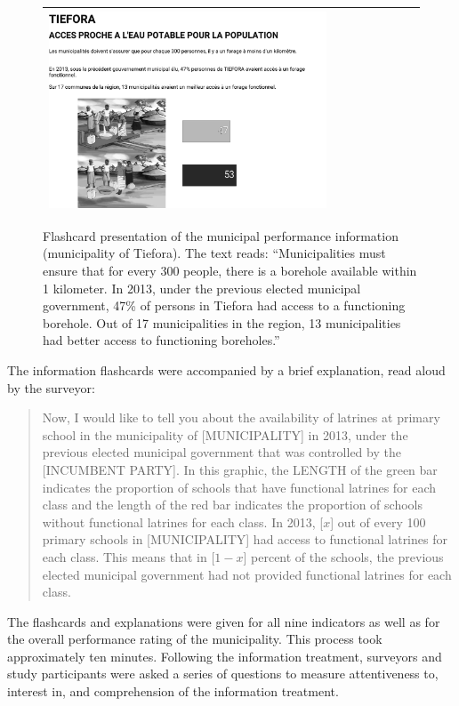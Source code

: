 \documentclass[11pt]{article}
\begin{document}
\begin{figure}
\begin{center}
\begin{tabularx}{0.8\textwidth}{|X|}
\hline
\vspace{0.1em}
\includegraphics[width=0.76\textwidth]{Figures/BF_Water-Infobw.png}\\
\hline
\end{tabularx}
\end{center}

\caption{Flashcard presentation of the municipal performance information (municipality of Tiefora). The text reads: ``Municipalities must ensure that for every 300 people, there is a borehole available within 1 kilometer. In 2013, under the previous elected municipal government, 47\% of persons in Tiefora had access to a functioning borehole. Out of 17 municipalities in the region, 13 municipalities had better access to functioning boreholes.''}
\label{FigFlashcardInfo}
\end{figure}

The information flashcards were accompanied by a brief explanation, read aloud by the surveyor: 
\begin{quote}
Now, I would like to tell you about the availability of latrines at primary school in the municipality of [MUNICIPALITY] in 2013, under the previous elected municipal government that was controlled by the [INCUMBENT PARTY]. In this graphic, the LENGTH of the green bar indicates the proportion of schools that have functional latrines for each class and the length of the red bar indicates the proportion of schools without functional latrines for each class. In 2013, [$x$] out of every 100 primary schools in [MUNICIPALITY] had access to functional latrines for each class. This means that in [$1-x$] percent of the schools, the previous elected municipal government had not provided functional latrines for each class.
\end{quote}
The flashcards and explanations were given for all nine indicators as well as for the overall performance rating of the municipality. This process took approximately ten minutes. Following the information treatment, surveyors and study participants were asked a series of questions to measure attentiveness to, interest in, and comprehension of the information treatment. 
\end{document}
